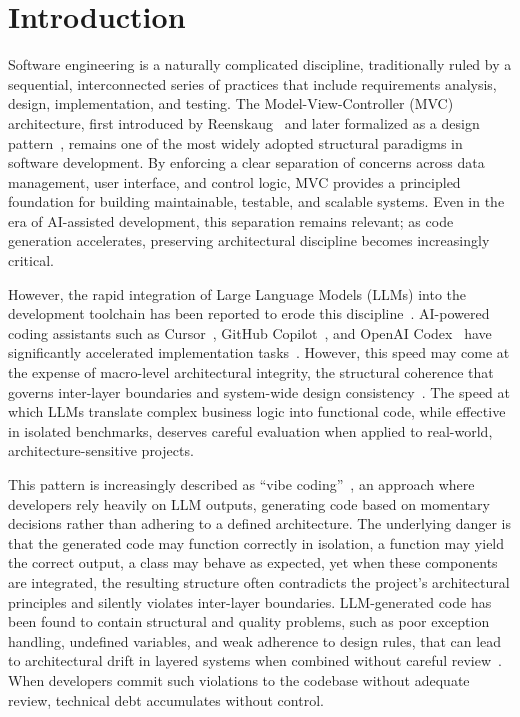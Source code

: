 \section{Introduction}
\label{sec:introduction}

Software engineering is a naturally complicated discipline, traditionally
ruled by a sequential, interconnected series of practices that include
requirements analysis, design, implementation, and testing. The Model-View-Controller (MVC) architecture, first introduced 
by Reenskaug~\citep{Reenskaug1979} and later formalized as a 
design pattern~\citep{Gamma1994}, remains one of the most 
widely adopted structural paradigms in software development.
By enforcing a clear separation of concerns across data management, user
interface, and control logic, MVC provides a principled foundation for
building maintainable, testable, and scalable systems. Even in the era
of AI-assisted development, this separation remains relevant; as code
generation accelerates, preserving architectural discipline becomes
increasingly critical.

However, the rapid integration of Large Language Models (LLMs) into the
development toolchain has been reported to erode this
discipline~\citep{Slater2025, Waseem2025, Ehsani2026}. AI-powered coding assistants
such as Cursor~\citep{Cursor2025}, GitHub Copilot~\citep{GitHubCopilot2025}, 
and OpenAI Codex~\citep{OpenAICodex2025} have significantly
accelerated implementation tasks~\citep{Hou2024}. However, this
speed may come at the expense of macro-level architectural
integrity, the structural coherence that governs inter-layer boundaries
and system-wide design consistency~\citep{Whiting2020}. The speed at which LLMs translate
complex business logic into functional code, while effective in isolated
benchmarks, deserves careful evaluation when applied to real-world,
architecture-sensitive projects.

This pattern is increasingly described as ``vibe
coding''~\citep{Fawzy2025}, an approach where developers rely heavily
on LLM outputs, generating code based on momentary decisions
rather than adhering to a defined architecture. The underlying danger is
that the generated code may function correctly in isolation, a function
may yield the correct output, a class may behave as expected, yet when
these components are integrated, the resulting structure often
contradicts the project's architectural principles and silently violates
inter-layer boundaries. LLM-generated code has been found to contain
structural and quality problems, such as poor exception handling,
undefined variables, and weak adherence to design rules, that can lead
to architectural drift in layered systems when combined without careful
review~\citep{Siddiq2024, Fawzy2025, Slater2025}. When developers
commit such violations to the codebase without adequate review,
technical debt accumulates without control.

